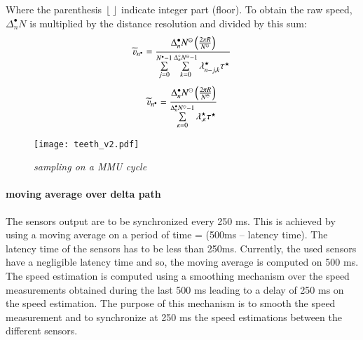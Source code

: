 Where the parenthesis $\left\lfloor \right\rfloor$ indicate integer part (floor). To obtain the raw speed, $\Delta^{\bullet}_n N$ is multiplied by the distance resolution and divided by this sum:
\begin{equation}
\widetilde{\varv}_{n^\bullet}=\frac{ \Delta^{\bullet}_n N^\ominus \left(\frac{2\pi R }{N^\ominus}\right)}{\sum\limits_{j=0}^{N^\bullet-1} \sum\limits_{k=0}^{\Delta^\circ_n N^\ominus-1}\lambda^\star_{n-j,k}\tau^\star}
\end{equation}
\begin{equation}
\widetilde{\varv}_{n^\bullet}=\frac{ \Delta^{\bullet}_n N^\ominus \left(\frac{2\pi R }{N^\ominus}\right)}{ \sum\limits_{\kappa=0}^{\Delta^\bullet_n N^\ominus-1}\lambda^\star_{,\kappa}\tau^\star}
\end{equation}


\begin{figure}[ht!]
\centerline{
\texttt{[image: teeth\_v2.pdf]}
}
\caption{\emph{sampling on a \gls{MMU} cycle}}
\label {fig:vteeth_samp}
\end{figure}
\paragraph{moving average over delta path}
The sensors output are to be synchronized every 250 ms. This is achieved by using a moving average on a period of time = (500ms – latency time). The latency time of the sensors has to be less than 250ms. Currently, the used sensors have a negligible latency time and so, the moving average is computed on 500 ms.
The speed estimation is computed using a smoothing mechanism over the speed measurements obtained during the last 500 ms leading to a delay of 250 ms on the speed estimation. The purpose of this mechanism is to smooth the speed measurement and to synchronize at 250 ms the speed estimations between the different
sensors.

